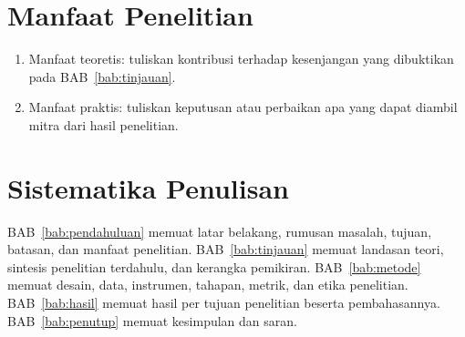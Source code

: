 \section{Manfaat Penelitian}
\label{sec:manfaat}


\begin{enumerate}
  \item Manfaat teoretis: tuliskan kontribusi terhadap kesenjangan yang
        dibuktikan pada BAB~\ref{bab:tinjauan}.
  \item Manfaat praktis: tuliskan keputusan atau perbaikan apa yang dapat
        diambil mitra dari hasil penelitian.
\end{enumerate}

\section{Sistematika Penulisan}
\label{sec:sistematika}


BAB~\ref{bab:pendahuluan} memuat latar belakang, rumusan masalah, tujuan,
batasan, dan manfaat penelitian. BAB~\ref{bab:tinjauan} memuat landasan
teori, sintesis penelitian terdahulu, dan kerangka pemikiran.
BAB~\ref{bab:metode} memuat desain, data, instrumen, tahapan, metrik, dan
etika penelitian. BAB~\ref{bab:hasil} memuat hasil per tujuan penelitian
beserta pembahasannya. BAB~\ref{bab:penutup} memuat kesimpulan dan saran.

